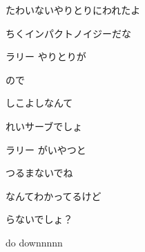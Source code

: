 \documentclass[a4paper,tate,twocolumn,12pt]{ltjtarticle}
\begin{document}
\begin{flushleft}
\begin{minipage}{\linewidth}
たわいないやりとりにわれたよ

ちくインパクトノイジーだな
\end{minipage}

\vspace{2em}

\noindent\begin{minipage}{\linewidth}
ラリー やりとりが

ので

しこよしなんて

れいサーブでしょ

ラリー がいやつと

つるまないでね

なんてわかってるけど

らないでしょ？
\end{minipage}

\vspace{2em}

\noindent\begin{minipage}{\linewidth}
do downnnnn
\end{minipage}

\end{flushleft}
\end{document}
